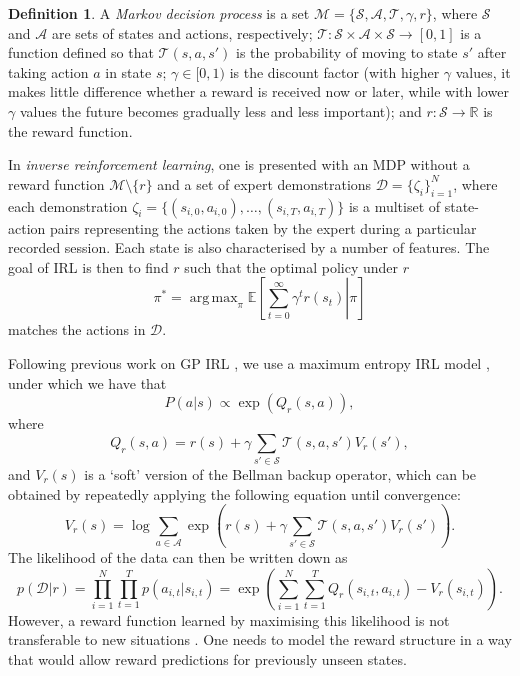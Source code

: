 \documentclass{mprop}
\theoremstyle{definition}
\newtheorem{definition}{Definition}
\DeclareMathOperator*{\argmax}{arg\,max}
\begin{document}
\begin{definition}
  A \emph{Markov decision process} is a set $\mathcal{M} = \{ \mathcal{S},
  \mathcal{A}, \mathcal{T}, \gamma, r \}$, where $\mathcal{S}$ and
  $\mathcal{A}$ are sets of states and actions, respectively; $\mathcal{T} :
  \mathcal{S} \times \mathcal{A} \times \mathcal{S} \to [0, 1]$ is a function
  defined so that $\mathcal{T}(s, a, s')$ is the probability of moving to state $s'$
  after taking action $a$ in state $s$; $\gamma \in [0, 1)$ is the discount
  factor (with higher $\gamma$ values, it makes little difference whether a
  reward is received now or later, while with lower $\gamma$ values the future
  becomes gradually less and less important); and $r : \mathcal{S} \to
  \mathbb{R}$ is the reward function.
\end{definition}

In \emph{inverse reinforcement learning}, one is presented with an MDP without a
reward function $\mathcal{M} \setminus \{ r \}$ and a set of expert
demonstrations $\mathcal{D} = \{ \zeta_i \}_{i=1}^N$, where each demonstration
$\zeta_i = \{ (s_{i,0}, a_{i,0}), \dots, (s_{i,T}, a_{i,T}) \}$ is a multiset of
state-action pairs representing the actions taken by the expert during a
particular recorded session. Each state is also characterised by a number of
features. The goal of IRL is then to find $r$ such that the optimal policy under
$r$
\[ \pi^* = \argmax_\pi \mathbb{E}\left[ \left. \sum_{t=0}^\infty \gamma^t r(s_t)
    \right| \pi \right] \]
matches the actions in $\mathcal{D}$.

Following previous work on GP IRL
\cite{DBLP:conf/nips/LevinePK11,DBLP:conf/uai/JinDAS17}, we use a maximum
entropy IRL model \cite{ziebart2008maximum}, under which we have that
\[ P(a | s) \propto \exp(Q_r(s, a)), \]
where
\begin{equation}
  Q_r(s, a) = r(s) + \gamma\sum_{s' \in \mathcal{S}}
  \mathcal{T}(s, a, s')V_r(s'),
\end{equation} %
and $V_r(s)$ is a `soft' version of the Bellman backup operator, which can be
obtained by repeatedly applying the following equation until convergence:
\cite{DBLP:conf/nips/LevinePK11,supplementary_material}
\[ V_r(s) = \log \sum_{a \in \mathcal{A}} \exp\left( r(s) + \gamma\sum_{s' \in
      \mathcal{S}} \mathcal{T}(s, a, s')V_r(s') \right). \]
The likelihood of the data can then be written down as
\cite{DBLP:conf/uai/JinDAS17,DBLP:conf/nips/LevinePK11}
\begin{equation} \label{pDr}
  p(\mathcal{D} | r) = \prod_{i=1}^N \prod_{t=1}^T p(a_{i,t} | s_{i,t}) = \exp\left( \sum_{i=1}^N \sum_{t=1}^T Q_r(s_{i,t}, a_{i,t}) - V_r(s_{i,t}) \right).
\end{equation}
However, a reward function learned by maximising this likelihood is not
transferable to new situations
\cite{DBLP:conf/uai/JinDAS17,DBLP:conf/nips/LevinePK11}. One needs to model the
reward structure in a way that would allow reward predictions for previously
unseen states.
\end{document}
